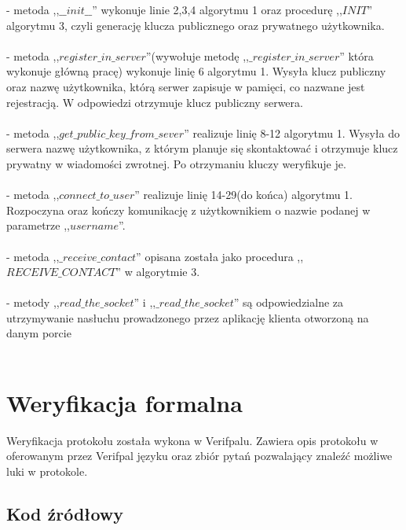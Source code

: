 \documentclass[11pt]{article}
\begin{document}
- metoda ,,$\_\_init\_\_$'' wykonuje linie 2,3,4 algorytmu 1 oraz procedurę ,,$INIT$'' algorytmu 3, czyli generację klucza publicznego oraz prywatnego użytkownika.\\\\
- metoda ,,$register\_in\_server$''(wywołuje metodę ,,$\_register\_in\_server$'' która wykonuje główną pracę) wykonuje linię 6 algorytmu 1. Wysyła klucz publiczny oraz nazwę użytkownika, którą serwer zapisuje w pamięci, co nazwane jest rejestracją. W odpowiedzi otrzymuje klucz publiczny serwera.\\\\
- metoda ,,$get\_public\_key\_from\_sever$'' realizuje linię 8-12 algorytmu 1. Wysyła do serwera nazwę użytkownika, z którym planuje się skontaktować i otrzymuje klucz prywatny w wiadomości zwrotnej. Po otrzymaniu kluczy weryfikuje je.\\\\
-  metoda ,,$connect\_to\_user$'' realizuje linię 14-29(do końca) algorytmu 1. Rozpoczyna oraz kończy komunikację z użytkownikiem o nazwie podanej w parametrze ,,$username$''.\\\\
-  metoda ,,$\_receive\_contact$'' opisana została jako procedura ,,$RECEIVE\_CONTACT$'' w algorytmie 3.\\\\
- metody ,,$read\_the\_socket$'' i ,,$\_read\_the\_socket$'' są odpowiedzialne za utrzymywanie nasłuchu prowadzonego przez aplikację klienta otworzoną na danym porcie \\\\



\clearpage
\section{Weryfikacja formalna}
Weryfikacja protokołu została wykona w Verifpalu. Zawiera opis protokołu w oferowanym przez Verifpal języku oraz zbiór pytań pozwalający znaleźć możliwe luki w protokole.
\subsection{Kod źródłowy}
\end{document}
